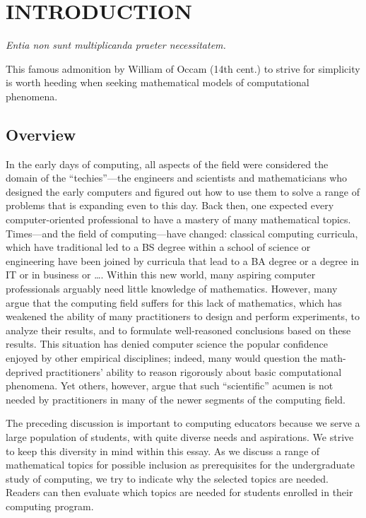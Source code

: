 
\chapter{INTRODUCTION}
\label{ch:intro}

\begin{center}
{\it Entia non sunt multiplicanda praeter necessitatem.} \\
\end{center}

\noindent
This famous admonition by William of Occam (14th cent.) to strive for
simplicity is worth heeding when seeking mathematical models of
computational phenomena.

\section{Overview}
\label{sec:overview}

In the early days of computing, all aspects of the field were
considered the domain of the ``techies''---the engineers and
scientists and mathematicians who designed the early computers and
figured out how to use them to solve a range of problems that is
expanding even to this day.  Back then, one expected every
computer-oriented professional to have a mastery of many mathematical
topics.  Times---and the field of computing---have changed: classical
computing curricula, which have traditional led to a BS degree within
a school of science or engineering have been joined by curricula that
lead to a BA degree or a degree in IT or in business or \ldots.
Within this new world, many aspiring computer professionals arguably
need little knowledge of mathematics.  However, many argue that the
computing field suffers for this lack of mathematics, which has
weakened the ability of many practitioners to design and perform
experiments, to analyze their results, and to formulate well-reasoned
conclusions based on these results.  This situation has denied
computer science the popular confidence enjoyed by other empirical
disciplines; indeed, many would question the math-deprived
practitioners' ability to reason rigorously about basic computational
phenomena.  Yet others, however, argue that such ``scientific'' acumen
is not needed by practitioners in many of the newer segments of the
computing field.

The preceding discussion is important to computing educators because
we serve a large population of students, with quite diverse needs and
aspirations.  We strive to keep this diversity in mind within this
essay.  As we discuss a range of mathematical topics for possible
inclusion as prerequisites for the undergraduate study of computing,
we try to indicate why the selected topics are needed.  Readers can
then evaluate which topics are needed for students enrolled in their
computing program.

